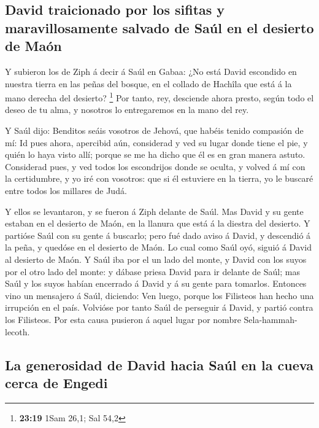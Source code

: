\hypertarget{david-traicionado-por-los-sifitas-y-maravillosamente-salvado-de-sauxfal-en-el-desierto-de-mauxf3n}{%
\subsection{David traicionado por los sifitas y maravillosamente salvado
de Saúl en el desierto de
Maón}\label{david-traicionado-por-los-sifitas-y-maravillosamente-salvado-de-sauxfal-en-el-desierto-de-mauxf3n}}

 Y subieron los de Ziph á decir á Saúl en Gabaa: ¿No está
David escondido en nuestra tierra en las peñas del bosque, en el collado
de Hachîla que está á la mano derecha del desierto? \footnote{\textbf{23:19}
  1Sam 26,1; Sal 54,2}  Por tanto, rey, desciende ahora
presto, según todo el deseo de tu alma, y nosotros lo entregaremos en la
mano del rey.

 Y Saúl dijo: Benditos seáis vosotros de Jehová, que
habéis tenido compasión de mí:  Id pues ahora, apercibid
aún, considerad y ved su lugar donde tiene el pie, y quién lo haya visto
allí; porque se me ha dicho que él es en gran manera astuto.
 Considerad pues, y ved todos los escondrijos donde se
oculta, y volved á mí con la certidumbre, y yo iré con vosotros: que si
él estuviere en la tierra, yo le buscaré entre todos los millares de
Judá.

 Y ellos se levantaron, y se fueron á Ziph delante de
Saúl. Mas David y su gente estaban en el desierto de Maón, en la llanura
que está á la diestra del desierto.  Y partióse Saúl con
su gente á buscarlo; pero fué dado aviso á David, y descendió á la peña,
y quedóse en el desierto de Maón. Lo cual como Saúl oyó, siguió á David
al desierto de Maón.  Y Saúl iba por el un lado del
monte, y David con los suyos por el otro lado del monte: y dábase priesa
David para ir delante de Saúl; mas Saúl y los suyos habían encerrado á
David y á su gente para tomarlos.  Entonces vino un
mensajero á Saúl, diciendo: Ven luego, porque los Filisteos han hecho
una irrupción en el país.  Volvióse por tanto Saúl de
perseguir á David, y partió contra los Filisteos. Por esta causa
pusieron á aquel lugar por nombre Sela-hammah-lecoth. 

\hypertarget{la-generosidad-de-david-hacia-sauxfal-en-la-cueva-cerca-de-engedi}{%
\subsection{La generosidad de David hacia Saúl en la cueva cerca de
Engedi}\label{la-generosidad-de-david-hacia-sauxfal-en-la-cueva-cerca-de-engedi}}

